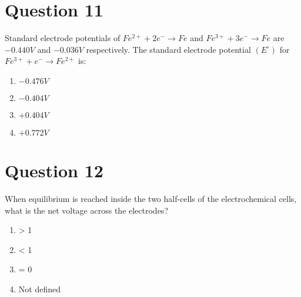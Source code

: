 \documentclass{article}
\begin{document}
\section*{Question 11}
Standard electrode potentials of \(Fe ^{2+}+2 e ^{-} \rightarrow Fe\) and \(Fe ^{3+}+3 e ^{-} \rightarrow Fe\) are \(-0.440 V\) and \(-0.036 V\) respectively. The standard electrode potential \(\left( E ^{\circ}\right)\) for \(Fe ^{3+}+ e ^{-} \rightarrow Fe ^{2+}\) is:
\begin{enumerate}[label=(\alph*)]
\item \(-0.476 V\)
\item \(-0.404 V\)
\item \(+0.404 V\)
\item \(+0.772 V\)
\end{enumerate}
\newpage
\section*{Question 12}
When equilibrium is reached inside the two half-cells of the electrochemical cells, what is the net voltage across the electrodes?
\begin{enumerate}[label=(\alph*)]
\item > 1
\item < 1
\item = 0
\item Not defined
\end{enumerate}
\newpage
\end{document}
